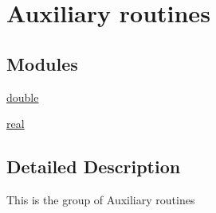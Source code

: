 \hypertarget{group__auxiliaryPT}{}\section{Auxiliary routines}
\label{group__auxiliaryPT}
\subsection*{Modules}
\begin{DoxyCompactItemize}
\item 
\hyperlink{group__doublePTauxiliary}{double}
\item 
\hyperlink{group__realPTauxiliary}{real}
\end{DoxyCompactItemize}


\subsection{Detailed Description}
This is the group of Auxiliary routines 
